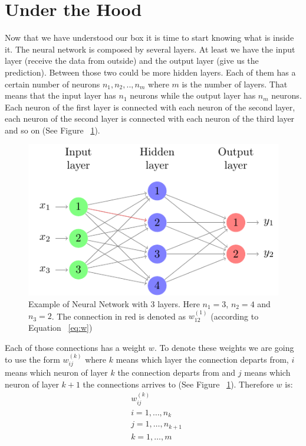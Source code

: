 
\section{Under the Hood}
\label{sec:hood}
Now that we have understood our box it is time to start knowing what is inside it. The neural network is composed by several layers. At least we have the input layer (receive the data from outside) and the output layer (give us the prediction). Between those two could be more hidden layers. Each of them has a certain number of neurons $n_1, n_2, .., n_m$ where $m$ is the number of layers. That means that the input layer has $n_1$ neurons while the output layer has $n_m$ neurons. Each neuron of the first layer is connected with each neuron of the second layer, each neuron of the second layer is connected with each neuron of the third layer and so on (See Figure ~\ref{fig:net2}). \\

\begin{figure}
  \center
  \includegraphics[scale=1.5]{images/net2.pdf}
  \caption{\label{fig:net2}Example of Neural Network with 3 layers. Here $n_1=3$, $n_2=4$ and $n_3=2$. The connection in red is denoted as $w^{(1)}_{12}$ (according to Equation ~\ref{eq:w})}
\end{figure}

Each of those connections has a weight $w$. To denote these weights we are going to use the form $w_{ij}^{(k)}$ where $k$ means which layer the connection departs from, $i$ means which neuron of layer $k$ the connection departs from and $j$ means which neuron of layer $k+1$ the connections arrives to (See Figure ~\ref{fig:net2}). Therefore $w$ is:
\begin{equation}
\begin{aligned}
  & w^{(k)}_{ij} \\
  & i=1,\dots,n_k \\
  & j=1,\dots,n_{k+1} \\
  & k=1,\dots,m
\end{aligned}
\label{eq:w}
\end{equation}\\

